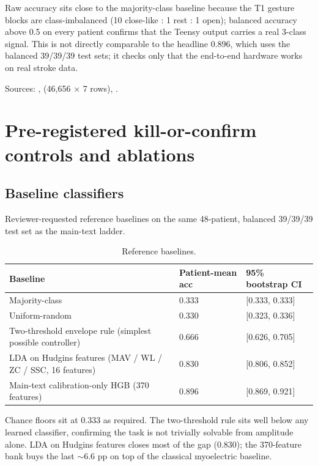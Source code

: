 \documentclass{article}
\begin{document}
Raw accuracy sits close to the majority-class baseline because the T1 gesture blocks are class-imbalanced (10 close-like : 1 rest : 1 open); balanced accuracy above 0.5 on every patient confirms that the Teensy output carries a real 3-class signal. This is not directly comparable to the headline 0.896, which uses the balanced 39/39/39 test sets; it checks only that the end-to-end hardware works on real stroke data.

Sources: ,  (46{,}656 $\times$ 7 rows), .

\section{Pre-registered kill-or-confirm controls and ablations}
\label{app:controls}

\subsection{Baseline classifiers}
\label{app:baselines}

Reviewer-requested reference baselines on the same 48-patient, balanced 39/39/39 test set as the main-text ladder.

\begin{table}[h]
  \caption{Reference baselines.}
  \label{tab:baselines}
  \centering
  \small
  \begin{tabular}{lll}
    \toprule
    Baseline & Patient-mean acc & 95\% bootstrap CI \\
    \midrule
    Majority-class & 0.333 & [0.333, 0.333] \\
    Uniform-random & 0.330 & [0.323, 0.336] \\
    Two-threshold envelope rule (simplest possible controller) & 0.666 & [0.626, 0.705] \\
    LDA on Hudgins features \citep{hudgins1993} (MAV / WL / ZC / SSC, 16 features) & 0.830 & [0.806, 0.852] \\
    Main-text calibration-only HGB (370 features) & 0.896 & [0.869, 0.921] \\
    \bottomrule
  \end{tabular}
\end{table}

Chance floors sit at 0.333 as required. The two-threshold rule sits well below any learned classifier, confirming the task is not trivially solvable from amplitude alone. LDA on Hudgins features closes most of the gap (0.830); the 370-feature bank buys the last $\sim$6.6 pp on top of the classical myoelectric baseline.
\end{document}
